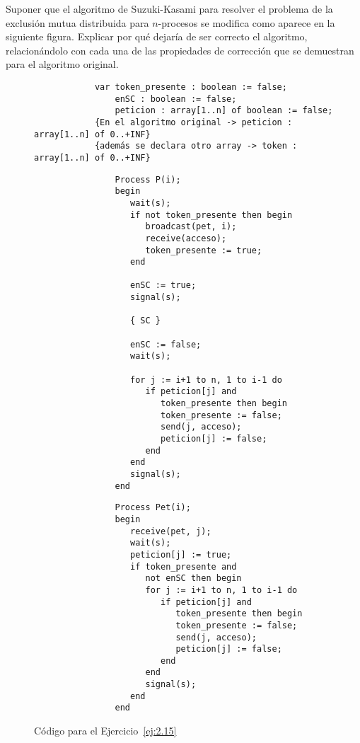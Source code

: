 \begin{ejercicio}\label{ej:2.15} %
    Suponer que el algoritmo de Suzuki-Kasami para resolver el problema de la exclusión mutua distribuida para $n$-procesos se modifica como aparece en la siguiente figura. Explicar por qué dejaría de ser correcto el algoritmo, relacionándolo con cada una de las propiedades de corrección que se demuestran para el algoritmo original.
    \begin{figure}
        \centering
        \begin{verbatim}
            var token_presente : boolean := false;
                enSC : boolean := false;
                peticion : array[1..n] of boolean := false;
            {En el algoritmo original -> peticion : array[1..n] of 0..+INF}
            {además se declara otro array -> token : array[1..n] of 0..+INF}
        \end{verbatim}
        \setlength{\columnsep}{1cm}
        \begin{multicols}{2}
            \begin{verbatim}
                Process P(i);
                begin
                   wait(s);
                   if not token_presente then begin
                      broadcast(pet, i);
                      receive(acceso);
                      token_presente := true;
                   end

                   enSC := true;
                   signal(s);

                   { SC }

                   enSC := false;
                   wait(s);

                   for j := i+1 to n, 1 to i-1 do
                      if peticion[j] and
                         token_presente then begin
                         token_presente := false;
                         send(j, acceso);
                         peticion[j] := false;
                      end
                   end
                   signal(s);
                end
            \end{verbatim}
            \begin{verbatim}
                Process Pet(i);
                begin
                   receive(pet, j);
                   wait(s);
                   peticion[j] := true;
                   if token_presente and
                      not enSC then begin
                      for j := i+1 to n, 1 to i-1 do
                         if peticion[j] and
                            token_presente then begin
                            token_presente := false;
                            send(j, acceso);
                            peticion[j] := false;
                         end
                      end
                      signal(s);
                   end
                end
            \end{verbatim}
        \end{multicols}
        \caption{Código para el Ejercicio~\ref{ej:2.15}}
        \label{fig:cod_15}
    \end{figure}
\end{ejercicio}

